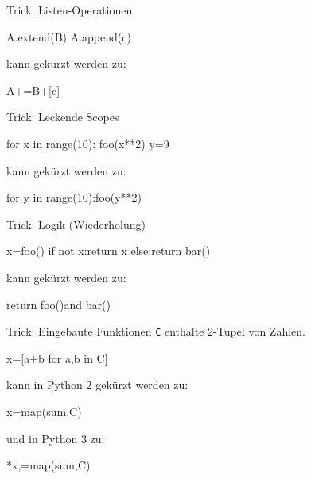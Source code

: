 \documentclass[xcolor=dvipsnames, aspectratio=169, 14pt]{beamer}
\begin{document}
\begin{frame}[fragile]{Trick: Listen-Operationen}
	\begin{python3code}
	A.extend(B)
	A.append(c)
	\end{python3code}
	
	\vfill
	
	kann gekürzt werden zu:
	
	\vfill
	
	\begin{python3code}
	A+=B+[c]
	\end{python3code}
\end{frame}

\begin{frame}[fragile]{Trick: Leckende Scopes}
	\begin{python3code}
	for x in range(10):
	   foo(x**2)
	y=9
	\end{python3code}
	
	\vfill
	
	kann gekürzt werden zu:
	
	\vfill
	
	\begin{python3code}
	for y in range(10):foo(y**2)
	\end{python3code}
\end{frame}

\begin{frame}[fragile]{Trick: Logik (Wiederholung)}
	\begin{python3code}
	x=foo()
	if not x:return x
	else:return bar()
	\end{python3code}
	
	\vfill
	
	kann gekürzt werden zu:
	
	\vfill
	
	\begin{python3code}
	return foo()and bar()
	\end{python3code}
\end{frame}

\begin{frame}[fragile]{Trick: Eingebaute Funktionen}
	\texttt{C} enthalte 2-Tupel von Zahlen.
	
	\vfill
	
	\begin{python3code}
	x=[a+b for a,b in C]
	\end{python3code}
	
	\vfill
	
	kann in Python 2 gekürzt werden zu:
	
	\vfill
	
	\begin{python3code}
	x=map(sum,C)
	\end{python3code}
	
	\vfill
	
	und in Python 3 zu:
	
	\vfill
	
	\begin{python3code}
	*x,=map(sum,C)
	\end{python3code}
\end{frame}
\end{document}
